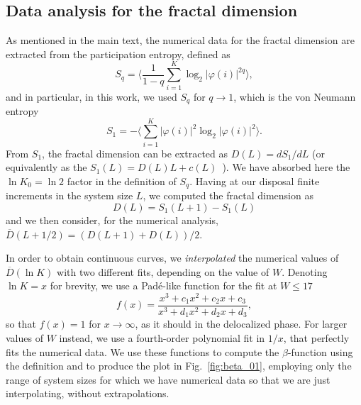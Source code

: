 \documentclass[reprint,aps,prl,superscriptaddress,english,nolongbibliography]{revtex4-2}
\begin{document}
{\subsection{Data analysis for the fractal dimension}

As mentioned in the main text, the numerical data for the fractal dimension are extracted from the participation entropy, defined as
\begin{equation}
    S_q = \Big\langle \frac{1}{1-q} \sum_{i=1}^{K} \log_2 |\varphi(i)|^{2q} \Big\rangle,
\end{equation}
and in particular, in this work, we used $S_q$ for $q\to 1$, which is the von Neumann entropy
\begin{equation}
\label{eq:vonNeumann}
    S_1 = - \Big \langle \sum_{i=1}^{K}  |\varphi(i)|^{2} \log_2 |\varphi(i)|^{2} \Big\rangle.
\end{equation}
From $S_1$, the fractal dimension can be extracted as $D(L)=d S_1 /dL$ (or equivalently as the $S_1(L) = D(L)L + c(L)$~\cite{sierant2023universality}). We have absorbed here the $\ln K_0 = \ln 2$ factor in the definition of $S_q$.
Having at our disposal finite increments in the system size $L$, we computed the fractal dimension as
\begin{equation}
    D(L) = S_1(L+1)-S_1(L)
\end{equation}
and we then consider, for the numerical analysis, $\overline{D}(L+1/2) = (D(L+1)+D(L))/2$.

In order to obtain continuous curves, we \emph{interpolated} the numerical values of $\overline{D}(\ln K)$ with two different fits, depending on the value of $W$. Denoting $\ln K=x$ for brevity, we use a Pad\'e-like function for the fit at $W\leq 17$  
\begin{equation}
    f(x) = \frac{x^3 + c_1 x^2 + c_2 x + c_3}{x^3 + d_1 x^2 + d_2 x + d_3},
\end{equation}
so that $f(x)=1$ for $x \to \infty$, as it should in the delocalized phase. For larger values of $W$ instead, we use a fourth-order polynomial fit in $1/x$, that perfectly fits the numerical data. We use these functions to compute the $\beta$-function using the definition and to produce the plot in Fig.~\ref{fig:beta_01}, employing only the range of system sizes for which we have numerical data so that we are just interpolating, without extrapolations.

}
\end{document}
